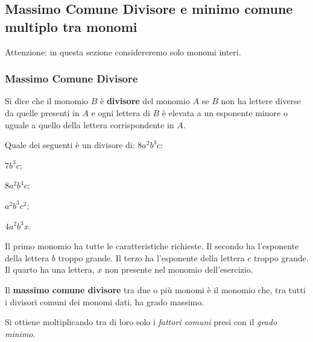 
\subsection{Massimo Comune Divisore e minimo comune multiplo tra monomi}
\label{subsec:monomi_mcdemcm}

Attenzione: in questa sezione considereremo solo monomi interi.

\subsubsection{Massimo Comune Divisore}

\begin{definizione}{}{}
Si dice che il monomio \(B\) è \textbf{divisore} del monomio \(A\) se 
\(B\) non ha lettere diverse da quelle presenti in \(A\) e ogni 
lettera di \(B\) è elevata a un esponente minore o uguale a quello della 
lettera corrispondente in \(A\). 
\end{definizione}

\begin{esempio}{}{}
Quale dei seguenti è un divisore di: \({8a^{2}b^{3}c}\): 

\begin{enumerate*}
\item \({7b^{3}c}\); \qquad~
\item \({8a^{2}b^{4}c}\); \qquad~
\item \({a^{2}b^{3}c^{2}}\); \qquad~
\item \({4a^{2}b^{3}x}\).
\end{enumerate*}

Il primo monomio ha tutte le caratteristiche richieste.
Il secondo ha l'esponente della lettera \(b\) troppo grande.
Il terzo ha l'esponente della lettera \(c\) troppo grande.
Il quarto ha una lettera, \(x\) non presente nel monomio dell'esercizio. 
\end{esempio}

\begin{definizione}{}{}
 Il \textbf{massimo comune divisore} tra due o più monomi è il
monomio che, tra tutti i divisori comuni dei monomi dati, ha grado
massimo.

Si ottiene moltiplicando tra di loro solo i \emph{fattori comuni} presi con 
il \emph{grado minimo}.
\end{definizione}

